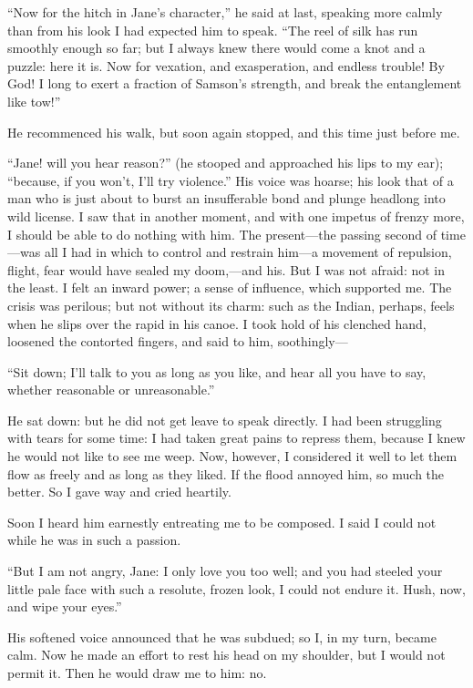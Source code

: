 \enquote{Now for the hitch in Jane's character,} he said at last,
speaking more calmly than from his look I had expected him to speak. 
\enquote{The reel of silk has run smoothly enough so far; but I always
knew there would come a knot and a puzzle: here it is. Now for
vexation, and exasperation, and endless trouble! By God! I long to
exert a fraction of Samson's strength, and break the entanglement like
tow!}

He recommenced his walk, but soon again stopped, and this time just
before me.

\enquote{Jane! will you hear reason?} (he stooped and approached his
lips to my ear); \enquote{because, if you won't, I'll try violence.} 
His voice was hoarse; his look that of a man who is just about to burst
an insufferable bond and plunge headlong into wild license. I saw that
in another moment, and with one impetus of frenzy more, I should be able
to do nothing with him. The present---the passing second of time---was
all I had in which to control and restrain him---a movement of
repulsion, flight, fear would have sealed my doom,---and his. But I was
not afraid: not in the least. I felt an inward power; a sense of
influence, which supported me. The crisis was perilous; but not without
its charm: such as the Indian, perhaps, feels when he slips over the
rapid in his canoe. I took hold of his clenched hand, loosened the
contorted fingers, and said to him, soothingly---

\enquote{Sit down; I'll talk to you as long as you like, and hear all
you have to say, whether reasonable or unreasonable.}

He sat down: but he did not get leave to speak directly. I had been
struggling with tears for some time: I had taken great pains to repress
them, because I knew he would not like to see me weep. Now, however, I
considered it well to let them flow as freely and as long as they
liked. If the flood annoyed him, so much the better. So I gave way and
cried heartily.

Soon I heard him earnestly entreating me to be composed. I said I could
not while he was in such a passion.

\enquote{But I am not angry, Jane: I only love you too well; and you had
steeled your little pale face with such a resolute, frozen look, I could
not endure it. Hush, now, and wipe your eyes.}

His softened voice announced that he was subdued; so I, in my turn,
became calm. Now he made an effort to rest his head on my shoulder, but
I would not permit it. Then he would draw me to him: no.

